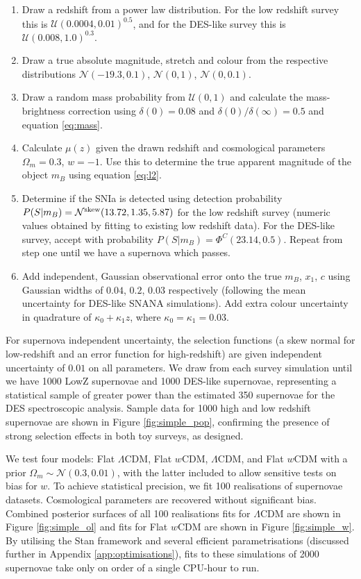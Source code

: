 \documentclass[a4paper,fleqn,usenatbib]{mnras}
\begin{document}
\begin{enumerate}[1.]
	\item Draw a redshift from a power law distribution. For the low redshift survey this is $\mathcal{U}(0.0004, 0.01)^{0.5}$, and for the DES-like survey this is $\mathcal{U}(0.008, 1.0)^{0.3}$.
	\item Draw a true absolute magnitude, stretch and colour from the respective distributions $\mathcal{N}(-19.3, 0.1)$, $\mathcal{N}(0, 1)$, $\mathcal{N}(0, 0.1)$.
	\item Draw a random mass probability from $\mathcal{U}(0, 1)$ and calculate the mass-brightness correction using $\delta(0) = 0.08$ and $\delta(0)/\delta(\infty) = 0.5$ and equation \eqref{eq:mass}.
	\item Calculate $\mu(z)$ given the drawn redshift and cosmological parameters $\Omega_m = 0.3$, $w = -1$. Use this to determine the true apparent magnitude of the object $m_B$ using equation \eqref{eq:l2}.
	\item Determine if the SNIa is detected using detection probability $P(S|m_B) = \mathcal{N}^{\rm skew}(13.72, 1.35, 5.87)$ for the low redshift survey (numeric values obtained by fitting to existing low redshift data). For the DES-like survey, accept with probability $P(S|m_B) = \Phi^C(23.14, 0.5)$. Repeat from step one until we have a supernova which passes.
	\item Add independent, Gaussian observational error onto the true $m_B$, $x_1$, $c$ using Gaussian widths of $0.04$, $0.2$, $0.03$ respectively (following the mean uncertainty for DES-like SNANA simulations). Add extra colour uncertainty in quadrature of $\kappa_0 + \kappa_1 z$, where $\kappa_0 = \kappa_1 = 0.03$.
\end{enumerate}

For supernova independent uncertainty, the selection functions (a skew normal for low-redshift and an error function for high-redshift) are given independent uncertainty of $0.01$ on all parameters. We draw from each survey simulation until we have 1000 LowZ supernovae and 1000 DES-like supernovae, representing a statistical sample of greater power than the estimated 350 supernovae for the DES spectroscopic analysis. Sample data for 1000 high and low redshift supernovae are shown in Figure \ref{fig:simple_pop}, confirming the presence of strong selection effects in both toy surveys, as designed. 

We test four models: Flat $\Lambda$CDM, Flat $w$CDM, $\Lambda$CDM, and Flat $w$CDM with a prior $\Omega_m \sim \mathcal{N}(0.3, 0.01)$, with the latter included to allow sensitive tests on bias for $w$. To achieve statistical precision, we fit 100 realisations of supernovae datasets. Cosmological parameters are recovered without significant bias. Combined posterior surfaces of all 100 realisations fits for $\Lambda$CDM are shown in Figure \ref{fig:simple_ol} and fits for Flat $w$CDM are shown in Figure \ref{fig:simple_w}. By utilising the Stan framework and several efficient parametrisations (discussed further in Appendix \ref{app:optimisations}), fits to these simulations of 2000 supernovae take only on order of a single CPU-hour to run.
\end{document}
